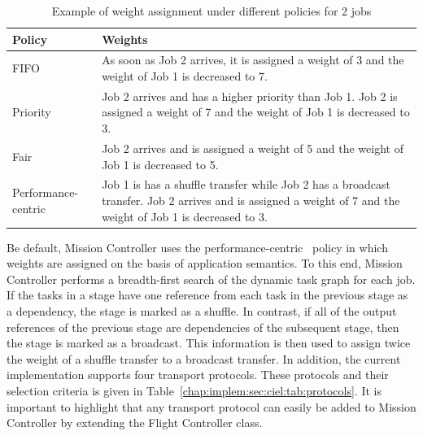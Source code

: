 \documentclass[a4paper,12pt,twoside,openright]{report}
\begin{document}
\begin{table}
  \centering
  \begin{tabularx}{5in}{|X|X|} 
    \hline
	\textbf{Policy} & \textbf{Weights} \\ \hline \hline
    FIFO & As soon as Job 2
    arrives, it is assigned a weight of 3 and the weight of Job 1 is decreased
    to 7. \\ \hline 
    Priority & Job 2 arrives and has a higher priority than Job 1. Job 2 is
    assigned a weight of 7 and the weight of Job 1 is decreased to 3. \\
    \hline 
    Fair & Job 2 arrives and is assigned a weight of 5 and the weight of Job
    1 is decreased to 5.\\ \hline 
    Performance-centric & Job 1 is has a shuffle transfer while Job 2 has a
    broadcast transfer. Job 2 arrives and is assigned a weight of 7 and the
    weight of Job 1 is decreased to 3.\\
    \hline
 \end{tabularx} 
  \caption{Example of weight assignment under different policies for 2 jobs}
  \label{chap:implem:sec:ciel:tab:policiesassign}
\end{table}

Be default, Mission Controller uses the
performance-centric~\cite{Kumar:2012:ACF} policy in which weights are assigned
on the basis of application semantics. To this end, Mission Controller performs
a breadth-first search of the dynamic task graph for each job. If the tasks in a
stage have one reference from each task in the previous stage as a dependency,
the stage is marked as a shuffle. In contrast, if all of the output references
of the previous stage are dependencies of the subsequent stage, then the stage
is marked as a broadcast. This information is then used to assign twice the
weight of a shuffle transfer to a broadcast transfer. In addition, the current
implementation supports four transport protocols. These protocols and their
selection criteria is given in Table~\ref{chap:implem:sec:ciel:tab:protocols}.
It is important to highlight that any transport protocol can easily be added to
Mission Controller by extending the Flight Controller class.
\end{document}
